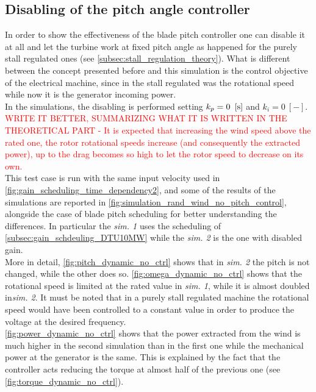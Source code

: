 \subsection{Disabling of the pitch angle controller}
In order to show the effectiveness of the blade pitch controller one can disable it at all and let the turbine work at fixed pitch angle as happened for the purely stall regulated ones (see \autoref{subsec:stall_regulation_theory}). What is different between the concept presented before and this simulation is the control objective of the electrical machine, since in the stall regulated was the rotational speed while now it is the generator incoming power. \\
In the simulations, the disabling is performed setting $k_p=0 \ \left[\si{\second}\right]$ and $k_i=0 \ [-]$. \textcolor{red}{WRITE IT BETTER, SUMMARIZING WHAT IT IS WRITTEN IN THE THEORETICAL PART - It is expected that increasing the wind speed above the rated one, the rotor rotational speeds increase (and consequently the extracted power), up to the drag becomes so high to let the rotor speed to decrease on its own. }\\
This test case is run with the same input velocity used in \autoref{fig:gain_scheduling_time_dependency2}, and some of the results of the simulations are reported in \autoref{fig:simulation_rand_wind_no_pitch_control}, alongside the case of blade pitch scheduling for better understanding the differences. In particular the \textit{sim. 1} uses the scheduling of \autoref{subsec:gain_schdeuling_DTU10MW} while the \textit{sim. 2} is the one with disabled gain.\\
More in detail, \autoref{fig:pitch_dynamic_no_ctrl} shows that in \textit{sim. 2} the pitch is not changed, while the other does so. \autoref{fig:omega_dynamic_no_ctrl} shows that the rotational speed is limited at the rated value in \textit{sim. 1}, while it is almost doubled in\textit{sim. 2}. It must be noted that in a purely stall regulated machine the rotational speed would have been controlled to a constant value in order to produce the voltage at the desired frequency.\\
\autoref{fig:power_dynamic_no_ctrl} shows that the power extracted from the wind is much higher in the second simulation than in the first one while the mechanical power at the generator is the same. This is explained by the fact that the controller acts reducing the torque at almost half of the previous one (see \autoref{fig:torque_dynamic_no_ctrl}).

